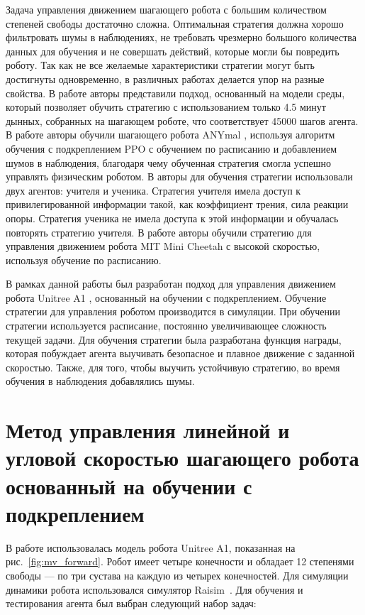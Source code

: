 Задача управления движением шагающего робота с большим количеством степеней свободы достаточно сложна. Оптимальная стратегия должна хорошо фильтровать шумы в наблюдениях, не требовать чрезмерно большого количества данных для обучения и 
не совершать действий, которые могли бы повредить роботу. Так как не все желаемые характеристики стратегии могут быть достигнуты одновременно, в различных работах делается упор на разные свойства. В работе \cite{yang2020data} авторы представили подход, основанный на модели среды, который позволяет обучить стратегию с использованием только 4.5 минут дынных, собранных на шагающем роботе, что соответствует 45000 шагов агента. В работе \cite{Hwangbo2019} авторы обучили шагающего робота ANYmal \cite{anymal}, используя алгоритм обучения с подкреплением PPO \cite{Schulman2017ProximalPO} с обучением по расписанию и добавлением шумов в наблюдения, благодаря чему обученная стратегия смогла успешно управлять физическим роботом. В  \cite{chalter} авторы для обучения стратегии использовали двух агентов: учителя и ученика. Стратегия учителя имела доступ к привилегированной информации такой, как коэффициент трения, сила реакции опоры.  Стратегия ученика не имела доступа к этой информации и обучалась повторять стратегию учителя. В работе \cite{rapid} авторы обучили стратегию для управления движением робота MIT Mini Cheetah с высокой скоростью, используя обучение по расписанию.

В рамках данной работы был разработан подход для управления движением робота Unitree A1 \cite{unitree}, основанный на обучении с подкреплением. Обучение стратегии для управления роботом производится в симуляции. При обучении стратегии используется расписание, постоянно увеличивающее сложность текущей задачи. Для обучения стратегии была разработана функция награды, которая побуждает агента выучивать безопасное и плавное движение с заданной скоростью. Также, для того, чтобы выучить устойчивую стратегию, во время обучения в наблюдения добавлялись шумы. 

\section{Метод управления линейной и угловой скоростью шагающего робота основанный на обучении с подкреплением}

В работе использовалась модель робота Unitree A1, показанная на рис.~\ref{fig:mv_forward}. Робот имеет четыре конечности и обладает 12 степенями свободы ---  по три сустава на каждую из четырех конечностей. Для симуляции динамики робота использовался симулятор Raisim~\cite{raisim}. Для обучения и тестирования агента был выбран следующий набор задач: 

